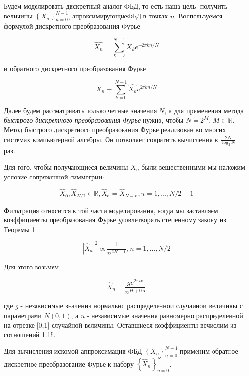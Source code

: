 Будем моделировать дискретный аналог ФБД, то есть наша цель- получить величины $\left\{X_n\right\}_{n=0}^{N-1}$, апроксимирующиеФБД в точках $n$. Воспользуемся формулой дискретного преобразования Фурье

\begin{equation}
	\hat{X_n} = \sum_{k=0}^{N-1}X_ke^{-2\pi kn/N}
\end{equation}

и обратного дискретного преобразования Фурье

\begin{equation}
	X_n = \sum_{k=0}^{N-1}\hat{X_k}e^{2\pi kn/N}
\end{equation}

Далее будем рассматривать только четные значения $N$, а для применения метода \textit{быстрого дискретного преобразования Фурье} нужно, чтобы $N=2^M$, $M \in \mathbb{N}$. Метод быстрого дискретного преобразования Фурье  реализован во многих системах компьютерной алгебры. Он позволяет сократить вычисления в $\frac{2N}{\log_2N}$ раз.

Для того, чтобы получающиеся величины $X_n$ были вещественными мы наложим условие сопряженной симметрии:

\begin{equation}
	\hat{X}_0, \hat{X}_{N/2} \in \mathbb{R}, \hat{X}_n = \hat{X}_{N-n}, n = 1,...,N/2-1
\end{equation}

Фильтрация относится к той части моделирования, когда мы заставляем коэффициенты преобразования Фурье удовлетворять степенному закону из Теоремы 1:

\begin{equation}
	|\hat{X}_n|^2 \propto \frac{1}{n^{2H+1}}, n = 1,...,N/2
\end{equation}

Для этого возьмем

\begin{equation}
	\hat{X}_n = \frac{ge^{2\pi iu}}{n^{H+0.5}}
\end{equation}

где $g$ - независимые значения нормально распределенной случайной величины с параметрами $N(0,1)$, а $u$ - независимые значения равномерно распределенной на отрезке [0,1] случайной величины. Оставшиеся коэффициенты вечислим из сотношений 1.15.

Для вычисления искомой аппроксимации ФБД $\left\{X_n\right\}_{n=0}^{N-1}$ применим обратное дискретное преобразование Фурье к набору $\left\{\hat{X}_n\right\}_{n=0}^{N-1}$.

